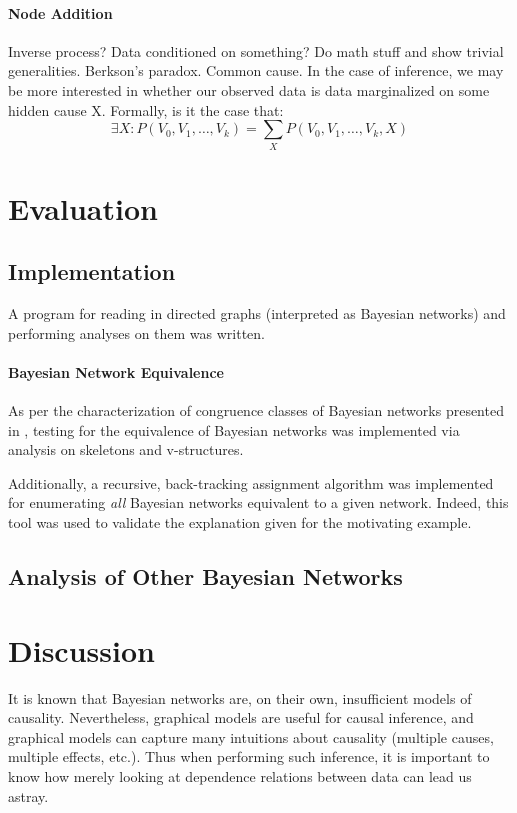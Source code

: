 \documentclass{article}
\begin{document}
	\paragraph{Node Addition}
	Inverse process? Data conditioned on something? Do math stuff and show trivial generalities. Berkson's paradox. Common cause.
	In the case of inference, we may be more interested in whether our observed data is data marginalized on some hidden cause X.
	Formally, is it the case that:
	$$
	\exists X: P(V_0, V_1, \dots, V_k) = \sum_X{P(V_0, V_1, \dots, V_k, X)}
	$$
	
	\section{Evaluation}
	\label{evaluation}
	
	\subsection{Implementation}
	
	A program for reading in directed graphs (interpreted as Bayesian networks) and performing analyses on them was written.
	
	\paragraph{Bayesian Network Equivalence}
	As per the characterization of congruence classes of Bayesian networks presented in \cite{verma2013equivalence,chickering2013transformational}, testing for the equivalence of Bayesian networks was implemented via analysis on skeletons and v-structures.
	
	Additionally, a recursive, back-tracking assignment algorithm was implemented for enumerating \emph{all} Bayesian networks equivalent to a given network.
	Indeed, this tool was used to validate the explanation given for the motivating example.
	
	\subsection{Analysis of Other Bayesian Networks}
	
	\section{Discussion}
	\label{discussion}
	
	It is known that Bayesian networks are, on their own, insufficient models of causality.
	Nevertheless, graphical models are useful for causal inference, and graphical models can capture many intuitions about causality (multiple causes, multiple effects, etc.).
	Thus when performing such inference, it is important to know how merely looking at dependence relations between data can lead us astray.
	
\end{document}
